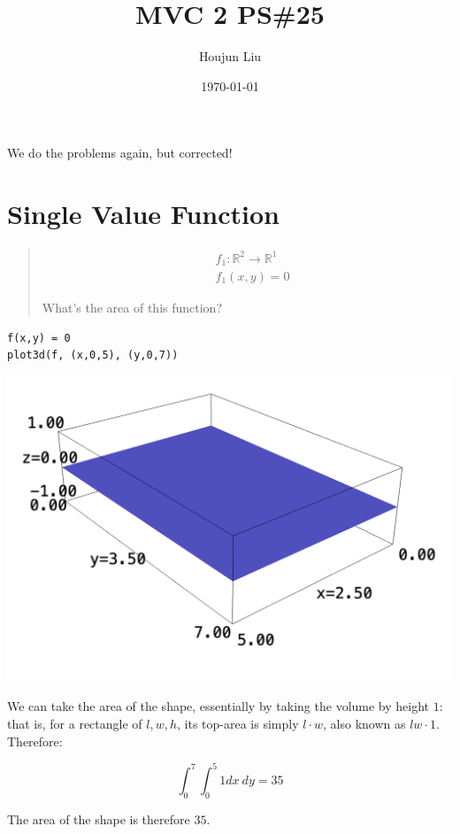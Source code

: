 \documentclass[letterpaper]{article}
\author{Houjun Liu}
\date{\today}
\title{MVC 2 PS\#25}
\renewcommand{\tableofcontents}{}
\renewcommand\maketitle{}
\begin{document}
\maketitle
\tableofcontents

We do the problems again, but corrected!

\section{Single Value Function}
\label{sec:orga7f1c1e}
\begin{quote}
\begin{align}
   &f_1: \mathbb{R}^2 \to \mathbb{R}^1 \\ 
&f_1(x,y) = 0
\end{align}

What's the area of this function?
\end{quote}

\begin{verbatim}
f(x,y) = 0
plot3d(f, (x,0,5), (y,0,7))
\end{verbatim}

\begin{center}
\includegraphics[width=.9\linewidth]{2022-04-25_09-53-13_screenshot.png}
\end{center}

We can take the area of the shape, essentially by taking the volume by height \(1\): that is, for a rectangle of \(l,w,h\), its top-area is simply \(l\cdot w\), also known as \(lw\cdot 1\). Therefore:

\begin{equation}
   \int_0^7 \int_0^5 1 dx\ dy = 35
\end{equation}

The area of the shape is therefore \(35\).
\end{document}
